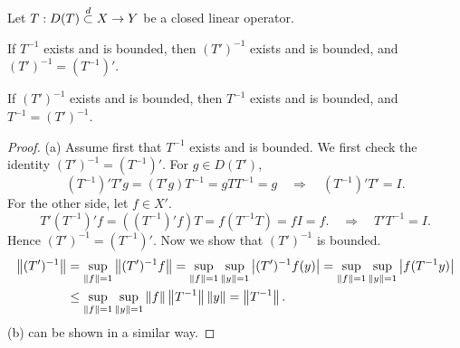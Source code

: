 \begin{theorem}\label{thm:transpose_inverse_commute}
    Let $T:D(T)\overset{d}{\subset} X\to Y$ be a closed linear operator. 
    \begin{thmenum}
        \item If $T^{-1}$ exists and is bounded, then $(T')^{-1}$ 
        exists and is bounded, and $(T')^{-1} = (T^{-1})'$. 
        \item If $(T')^{-1}$ exists and is bounded, then $T^{-1}$ exists and is bounded, 
        and $T^{-1} = (T')^{-1}$. 
    \end{thmenum}
\end{theorem}
\begin{proof}
    (a) Assume first that $T^{-1}$ exists and is bounded. We first check 
    the identity $(T')^{-1} = (T^{-1})'$. For $g\in D(T')$, 
    \begin{equation*}
        (T^{-1})'T'g = (T'g)T^{-1} = gTT^{-1} = g\quad\Rightarrow\quad 
        (T^{-1})'T' = I.
    \end{equation*}
    For the other side, let $f\in X'$.
    \begin{equation*}
        T'(T^{-1})'f = ((T^{-1})'f)T = f(T^{-1}T) = fI = f.
        \quad\Rightarrow\quad 
        T'T^{-1} = I.
    \end{equation*}
    Hence $(T')^{-1} = (T^{-1})'$. Now we show that $(T')^{-1}$ is bounded. 
    \begin{equation*}
        \begin{split}
            \left\lVert {(T')^{-1}} \right\rVert &= \sup_{\left\lVert {f} \right\rVert = 1} \left\lVert {(T')^{-1}f} \right\rVert
            = \sup_{\left\lVert {f} \right\rVert = 1}\sup_{\left\lVert {y} \right\rVert = 1} \left\lvert {(T')^{-1}f(y)} \right\rvert 
            = \sup_{\left\lVert {f} \right\rVert = 1}\sup_{\left\lVert {y} \right\rVert = 1} \left\lvert {f(T^{-1}y)} \right\rvert \\
            &\leq \sup_{\left\lVert {f} \right\rVert = 1}\sup_{\left\lVert {y} \right\rVert = 1} \left\lVert {f} \right\rVert\left\lVert {T^{-1}} \right\rVert\left\lVert {y} \right\rVert 
            = \left\lVert {T^{-1}} \right\rVert.
        \end{split}
    \end{equation*}
    (b) can be shown in a similar way.
\end{proof}

